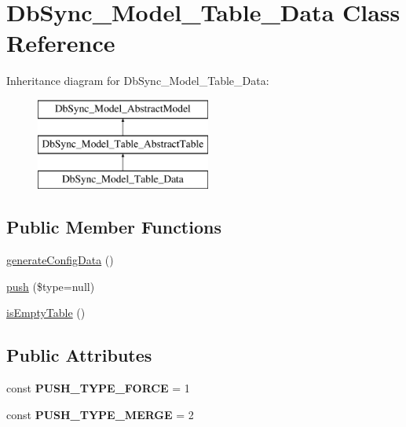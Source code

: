 \hypertarget{classDbSync__Model__Table__Data}{
\section{DbSync\_\-Model\_\-Table\_\-Data Class Reference}
\label{classDbSync__Model__Table__Data}
}
Inheritance diagram for DbSync\_\-Model\_\-Table\_\-Data:\begin{figure}[H]
\begin{center}
\leavevmode
\includegraphics[height=3.000000cm]{classDbSync__Model__Table__Data}
\end{center}
\end{figure}
\subsection*{Public Member Functions}
\begin{DoxyCompactItemize}
\item 
\hyperlink{classDbSync__Model__Table__Data_a8476edd65b932c52fab20345b40170be}{generateConfigData} ()
\item 
\hyperlink{classDbSync__Model__Table__Data_a8da434a0d1eac198c3a327d48901b7d0}{push} (\$type=null)
\item 
\hyperlink{classDbSync__Model__Table__Data_a4158723195a0172984d176d28055c332}{isEmptyTable} ()
\end{DoxyCompactItemize}
\subsection*{Public Attributes}
\begin{DoxyCompactItemize}
\item 
\hypertarget{classDbSync__Model__Table__Data_a97aad1ea1d7d55a934e821fb5e7858d4}{
const {\bfseries PUSH\_\-TYPE\_\-FORCE} = 1}
\label{classDbSync__Model__Table__Data_a97aad1ea1d7d55a934e821fb5e7858d4}

\item 
\hypertarget{classDbSync__Model__Table__Data_acfe1e2aaa5f3256fddadf6034b5cfd67}{
const {\bfseries PUSH\_\-TYPE\_\-MERGE} = 2}
\label{classDbSync__Model__Table__Data_acfe1e2aaa5f3256fddadf6034b5cfd67}

\end{DoxyCompactItemize}



